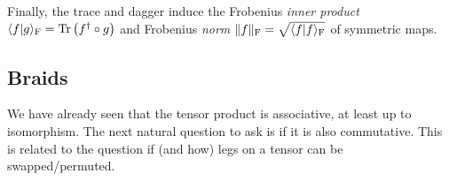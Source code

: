 Finally, the trace and dagger induce the Frobenius \emph{inner product} $\Fprod{f}{g} = \tr{\hconj{f} \compose g}$ and Frobenius \emph{norm} $\Fnorm{f} = \sqrt{\Fprod{f}{f}}$ of symmetric maps.


\subsection{Braids}
\label{subsec:nonablian:basics:braids}
%
We have already seen that the tensor product is associative, at least up to isomorphism.
%
The next natural question to ask is if it is also commutative.
%
This is related to the question if (and how) legs on a tensor can be swapped/permuted.

